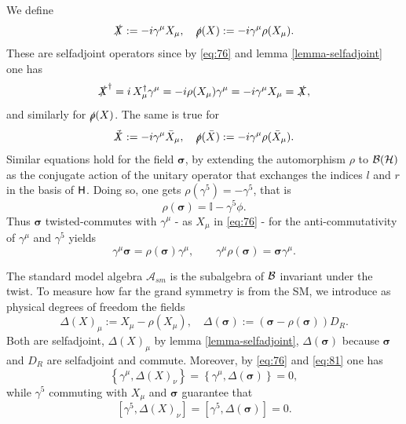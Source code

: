 \documentclass[11pt]{article}
\newcommand{\A}{\mathcal A}
\newcommand{\sig}{{\boldsymbol{\sigma}}}
\begin{document}
We define
\begin{equation}
\slashed X :=-i\gamma^\mu X_\mu, \quad\slashed \rho(X) := -i\gamma^\mu
\rho(X_\mu).
\label{eq:5}
\end{equation}
These are selfadjoint operators since by \eqref{eq:76} and lemma \ref{lemma-selfadjoint} one has
\begin{equation}
  \label{eq:75}
  \slashed X^\dagger = i \,X_\mu^\dagger \gamma^\mu = -i
  \rho(X_\mu)\gamma^\mu = -i \gamma^\mu X_\mu =  \slashed X,
\end{equation}
and similarly for $\slashed\rho(X)$. 
The same is true for
\begin{equation}
  \label{eq:85}
  \slashed{\bar X} := -i\gamma^\mu\bar X_\mu,\quad   \slashed\rho({\bar X}) := -i\gamma^\mu\rho(\bar X_\mu).
\end{equation}
Similar equations hold for the field $\sig$, by extending the automorphism $\rho$ to $\cal B(\cal H)$
as the conjugate action of the unitary operator that exchanges the
indices $l$ and $r$ in the basis of $\sf H$. Doing so, one gets
$\rho(\gamma^5) = - \gamma^5$, that is
\begin{equation}
  \label{eq:66}
  \rho(\sig) = \mathbb I - \gamma^5 \phi.
\end{equation} 
Thus $\sig$ twisted-commutes with $\gamma^\mu$ - as $X_\mu$ in
\eqref{eq:76} - for the anti-commutativity of $\gamma^\mu$ and $\gamma^5$ yields
\begin{equation}
\label{eq:81}
\gamma^\mu \sig = \rho(\sig)\gamma^\mu,\quad\quad \gamma^{\mu}\rho(\sig) = \sig\gamma^\mu.
\end{equation}

The standard model algebra $\A_{sm}$ is the subalgebra of $\cal B$
invariant under the twist. To measure how far the grand symmetry
is from the SM, we introduce as physical degrees of freedom
the fields
\begin{equation}
  \label{eq:171}
  \Delta(X)_\mu:= X_\mu -\rho(X_\mu), \quad \Delta(\sig) := (\sig - \rho(\sig))D_R.
\end{equation}
Both are selfadjoint, $\Delta(X)_\mu$ by  lemma
\ref{lemma-selfadjoint}, $\Delta(\sig)$ because $\sig$ and $D_R$ are
selfadjoint and commute. Moreover, by \eqref{eq:76} and \eqref{eq:81} one has
\begin{equation}
  \label{eq:146}
  \left\{\gamma^\mu, \Delta(X)_\nu\right\}
  =\left\{\gamma^\mu,\Delta(\sig)\right\} = 0, 
\end{equation} 
while  $\gamma^5$ commuting with $X_\mu$ and $\sig$ guarantee that
\begin{equation}
\left[\gamma^5, \Delta(X)_\nu\right] =\left[\gamma^5,
    \Delta(\sig)\right] = 0. 
\end{equation}
\end{document}
